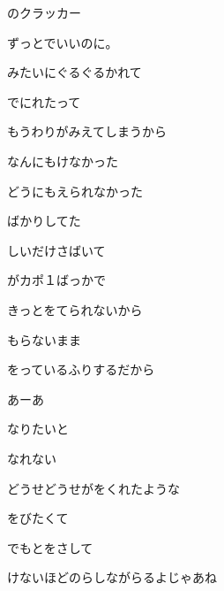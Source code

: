 \documentclass[a4paper,tate,twocolumn,12pt]{ltjtarticle}
\begin{document}
\thispagestyle{empty}

\begin{center}
{\LARGE {}のクラッカー}

{\large ずっとでいいのに。}
\end{center}

\vspace{1em}

\begin{flushleft}

\noindent\begin{minipage}{\linewidth}
みたいにぐるぐるかれて

でにれたって

もうわりがみえてしまうから

なんにもけなかった

どうにもえられなかった

ばかりしてた
\end{minipage}

\vspace{2em}

\noindent\begin{minipage}{\linewidth}
しいだけさばいて

がカポ１ばっかで

きっとをてられないから

もらないまま

をっているふりするだから

あーあ
\end{minipage}

\vspace{2em}

\noindent\begin{minipage}{\linewidth}
なりたいと

なれない

どうせどうせがをくれたような

をびたくて

でもとをさして

けないほどのらしながらるよじゃあね
\end{minipage}


\end{flushleft}
\end{document}
